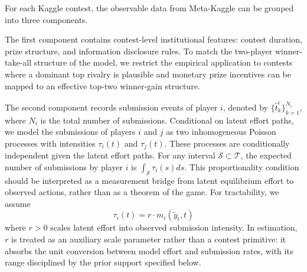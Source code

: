 \documentclass[mnsc]{informs3}
\begin{document}
For each Kaggle contest, the observable data from Meta-Kaggle can be grouped into three components.

The first component contains contest-level institutional features: contest duration, prize structure, and information disclosure rules.
To match the two-player winner-take-all structure of the model, we restrict the empirical application to contests where a dominant top rivalry is plausible and monetary prize incentives can be mapped to an effective top-two winner-gain structure.

The second component records submission events of player $i$, denoted by $\{\hat{t}^i_k\}_{k=1}^{N_i}$, where $N_i$ is the total number of submissions.
Conditional on latent effort paths, we model the submissions of players $i$ and $j$ as two inhomogeneous Poisson processes with intensities $\tau_i(t)$ and $\tau_j(t)$. These processes are conditionally independent given the latent effort paths.
For any interval $\mathcal{S}\subset\mathcal{T}$, the expected number of submissions by player $i$ is $\int_{\mathcal{S}}\tau_i(s)ds$.
This proportionality condition should be interpreted as a measurement bridge from latent equilibrium effort to observed actions, rather than as a theorem of the game.
For tractability, we assume
\begin{equation}\label{eq-model-intensity}
\tau_i(t) = r \cdot m_i(\tilde{y}_t, t)
\end{equation}
where $r>0$ scales latent effort into observed submission intensity.
In estimation, $r$ is treated as an auxiliary scale parameter rather than a contest primitive: it absorbs the unit conversion between model effort and submission rates, with its range disciplined by the prior support specified below.
\end{document}
